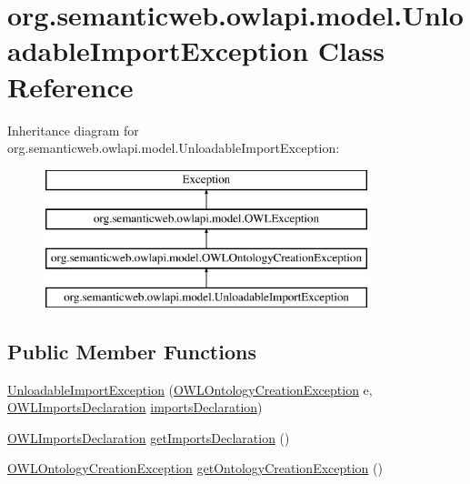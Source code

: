 \hypertarget{classorg_1_1semanticweb_1_1owlapi_1_1model_1_1_unloadable_import_exception}{\section{org.\-semanticweb.\-owlapi.\-model.\-Unloadable\-Import\-Exception Class Reference}
\label{classorg_1_1semanticweb_1_1owlapi_1_1model_1_1_unloadable_import_exception}
}
Inheritance diagram for org.\-semanticweb.\-owlapi.\-model.\-Unloadable\-Import\-Exception\-:\begin{figure}[H]
\begin{center}
\leavevmode
\includegraphics[height=4.000000cm]{classorg_1_1semanticweb_1_1owlapi_1_1model_1_1_unloadable_import_exception}
\end{center}
\end{figure}
\subsection*{Public Member Functions}
\begin{DoxyCompactItemize}
\item 
\hyperlink{classorg_1_1semanticweb_1_1owlapi_1_1model_1_1_unloadable_import_exception_a8a33990d08117b82798b3b12b7fd7455}{Unloadable\-Import\-Exception} (\hyperlink{classorg_1_1semanticweb_1_1owlapi_1_1model_1_1_o_w_l_ontology_creation_exception}{O\-W\-L\-Ontology\-Creation\-Exception} e, \hyperlink{interfaceorg_1_1semanticweb_1_1owlapi_1_1model_1_1_o_w_l_imports_declaration}{O\-W\-L\-Imports\-Declaration} \hyperlink{classorg_1_1semanticweb_1_1owlapi_1_1model_1_1_unloadable_import_exception_a0e35676e25f463503f90e1be0bf483af}{imports\-Declaration})
\item 
\hyperlink{interfaceorg_1_1semanticweb_1_1owlapi_1_1model_1_1_o_w_l_imports_declaration}{O\-W\-L\-Imports\-Declaration} \hyperlink{classorg_1_1semanticweb_1_1owlapi_1_1model_1_1_unloadable_import_exception_a04db1384f112abb28df121ae6fd4f81f}{get\-Imports\-Declaration} ()
\item 
\hyperlink{classorg_1_1semanticweb_1_1owlapi_1_1model_1_1_o_w_l_ontology_creation_exception}{O\-W\-L\-Ontology\-Creation\-Exception} \hyperlink{classorg_1_1semanticweb_1_1owlapi_1_1model_1_1_unloadable_import_exception_a879686f00ad8158b9b652cd4da030c91}{get\-Ontology\-Creation\-Exception} ()
\end{DoxyCompactItemize}
